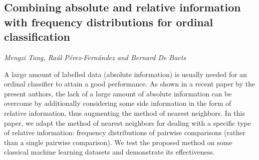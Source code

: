 \documentclass[../booklet.tex]{subfiles}
\begin{document}
\subsection[Combining absolute and relative information with frequency distributions for ordinal classification. {\it Mengzi Tang, Raúl Pérez-Fernández and Bernard De Baets}]{Combining absolute and relative information with frequency distributions for ordinal classification}
  

\begin{center}
  {\it Mengzi Tang, Raúl Pérez-Fernández and Bernard De Baets}
\end{center}



A large amount of labelled data (absolute information) is usually needed for an ordinal classifier to attain a good performance. As shown in a recent paper by the present authors, the lack of a large amount of absolute information can be overcome by additionally considering some side information in the form of relative information, thus augmenting the method of nearest neighbors. In this paper, we adapt the method of nearest neighbors for dealing with a specific type of relative information: frequency distributions of pairwise comparisons (rather than a single pairwise comparison). We test the proposed method on some classical machine learning datasets and demonstrate its effectiveness.

\end{document}
